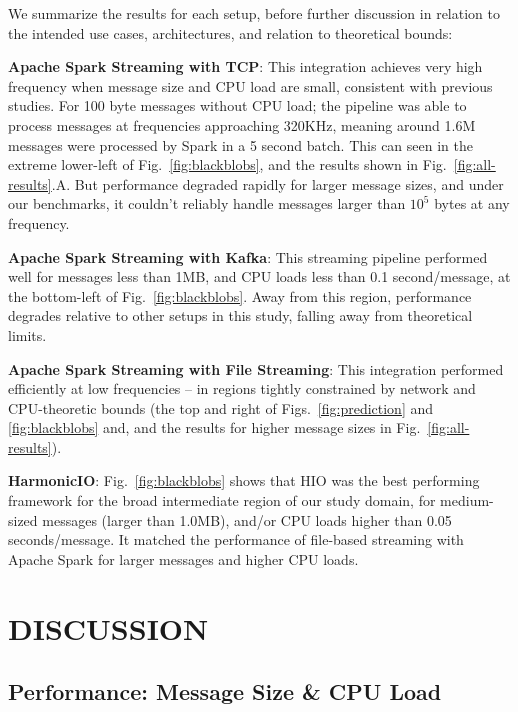 \documentclass[letterpaper,conference]{IEEEtran}
\begin{document}
We summarize the results for each setup, before further discussion in relation to the intended use cases, architectures, and relation to theoretical bounds:%

\textbf{Apache Spark Streaming with TCP}: 
This integration achieves very high frequency when message size and CPU load are small, consistent with previous studies. For 100 byte messages without CPU load; the pipeline was able to process messages at frequencies approaching 320KHz, meaning around 1.6M messages were processed by Spark in a 5 second batch. This can seen in the extreme lower-left of Fig.~\ref{fig:blackblobs}, and the results shown in Fig.~\ref{fig:all-results}.A. 
But performance degraded rapidly for larger message sizes, and under our benchmarks, it couldn't reliably handle messages larger than $10^5$ bytes at any frequency.

\textbf{Apache Spark Streaming with Kafka}:
This streaming pipeline performed well for messages less than 1MB, and CPU loads  less than 0.1 second/message, at the bottom-left of Fig.~\ref{fig:blackblobs}. Away from this region, performance degrades relative to other setups in this study, falling away from theoretical limits.

\textbf{Apache Spark Streaming with File Streaming}: 
This integration performed efficiently at low frequencies -- in regions tightly constrained by network and CPU-theoretic bounds (the top and right of Figs.~\ref{fig:prediction} and \ref{fig:blackblobs} and, and the results for higher message sizes in Fig.~\ref{fig:all-results}).

\textbf{HarmonicIO}:
Fig.~\ref{fig:blackblobs} shows that HIO was the best performing framework for the broad intermediate region of our study domain, 
for medium-sized messages (larger than 1.0MB), and/or CPU loads higher than 0.05 seconds/message. It matched the performance of file-based streaming with Apache Spark for larger messages and higher CPU loads.%

\section{DISCUSSION}\label{discussion}

\subsection{Performance: Message Size \& CPU Load}
\end{document}

